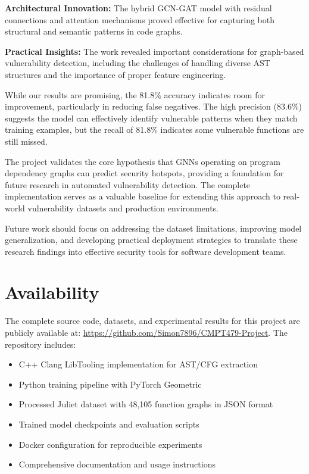 \textbf{Architectural Innovation:} The hybrid GCN-GAT model with residual connections and attention mechanisms proved effective for capturing both structural and semantic patterns in code graphs.

\textbf{Practical Insights:} The work revealed important considerations for graph-based vulnerability detection, including the challenges of handling diverse AST structures and the importance of proper feature engineering.

While our results are promising, the 81.8\% accuracy indicates room for improvement, particularly in reducing false negatives. The high precision (83.6\%) suggests the model can effectively identify vulnerable patterns when they match training examples, but the recall of 81.8\% indicates some vulnerable functions are still missed.

The project validates the core hypothesis that GNNs operating on program dependency graphs can predict security hotspots, providing a foundation for future research in automated vulnerability detection. The complete implementation serves as a valuable baseline for extending this approach to real-world vulnerability datasets and production environments.

Future work should focus on addressing the dataset limitations, improving model generalization, and developing practical deployment strategies to translate these research findings into effective security tools for software development teams.

\section*{Availability}

The complete source code, datasets, and experimental results for this project are publicly available at: \url{https://github.com/Simon7896/CMPT479-Project}. The repository includes:
\begin{itemize}
\item C++ Clang LibTooling implementation for AST/CFG extraction
\item Python training pipeline with PyTorch Geometric
\item Processed Juliet dataset with 48,105 function graphs in JSON format
\item Trained model checkpoints and evaluation scripts
\item Docker configuration for reproducible experiments
\item Comprehensive documentation and usage instructions
\end{itemize}

\printbibliography



